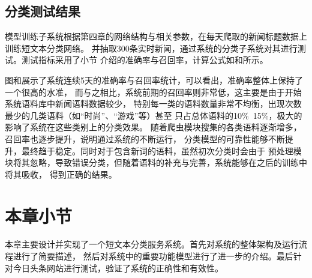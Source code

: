 \subsection{分类测试结果}
模型训练子系统根据第四章的网络结构与相关参数，在每天爬取的新闻标题数据上训练短文本分类网络。
并抽取300条实时新闻，通过系统的分类子系统对其进行测试。测试指标采用了\label{test_fun}小节
介绍的准确率与召回率，计算公式如\label{accuracy}和\label{recall}所示。

图和展示了系统连续5天的准确率与召回率统计，可以看出，准确率整体上保持了一个很高的水准，
而与之相比，系统前期的召回率则非常低，这主要是由于开始系统语料库中新闻语料数据较少，
特别每一类的语料数量非常不均衡，出现次数最少的几类语料（如“时尚”、“游戏”等）甚至
只占总体语料的10\%~15\%，极大的影响了系统在这些类别上的分类效果。
随着爬虫模块搜集的各类语料逐渐增多，召回率也逐步提升，说明通过系统的不断运行，
分类模型的可靠性能够不断提升，最终趋于稳定。同时对于包含新词的语料，虽然初次分类时会由于
预处理模块将其忽略，导致错误分类，但随着语料的补充与完善，系统能够在之后的训练中将其吸收，
得到正确的结果。
\section{本章小节}
本章主要设计并实现了一个短文本分类服务系统。首先对系统的整体架构及运行流程进行了简要描述，
然后对系统中的重要功能模型进行了进一步的介绍。最后针对今日头条网站进行测试，验证了系统的正确性和有效性。